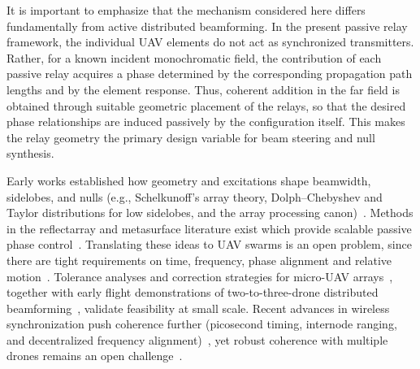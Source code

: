 \documentclass[11pt,letterpaper]{article}
\theoremstyle{definition}
\theoremstyle{plain}
\begin{document}
It is important to emphasize that the mechanism considered here differs fundamentally from active distributed beamforming. In the present passive relay framework, the individual UAV elements do not act as synchronized transmitters. Rather, for a known incident monochromatic field, the contribution of each passive relay acquires a phase determined by the corresponding propagation path lengths and by the element response. Thus, coherent addition in the far field is obtained through suitable geometric placement of the relays, so that the desired phase relationships are induced passively by the configuration itself. This makes the relay geometry the primary design variable for beam steering and null synthesis.

Early works established how geometry and excitations shape beamwidth, sidelobes, and nulls (e.g., Schelkunoff’s array theory, Dolph–Chebyshev and Taylor distributions for low sidelobes, and the array processing canon)~\cite{Schelkunoff1943,Dolph1946,Taylor1955,VanTrees2002,Mailloux2017_PhasedArrayBook}.  Methods in the reflectarray and metasurface literature exist which provide scalable passive phase control~\cite{HuangEncinar2007}.  Translating these ideas to UAV swarms is an open problem, since there are tight requirements on time, frequency, phase alignment and relative motion~\cite{Nanzer2021_TMTT_Review}. Tolerance analyses and correction strategies for micro-UAV arrays~\cite{PetkoWerner2009}, together with early flight demonstrations of two-to-three-drone distributed beamforming~\cite{Diao2019_USNCURSI,Mohanti2019_AirBeam}, validate feasibility at small scale. Recent advances in wireless synchronization push coherence further (picosecond timing, internode ranging, and decentralized frequency alignment)~\cite{Mghabghab2021_TMTT,Merlo2023_TMTT_PicoSync,Schlegel2023_MWTL_CoherentRadar,Ouassal2021_TWC,Rashid2023_TWC}, yet robust coherence with multiple drones  remains an open challenge~\cite{Nanzer2021_TMTT_Review}.  
\end{document}
